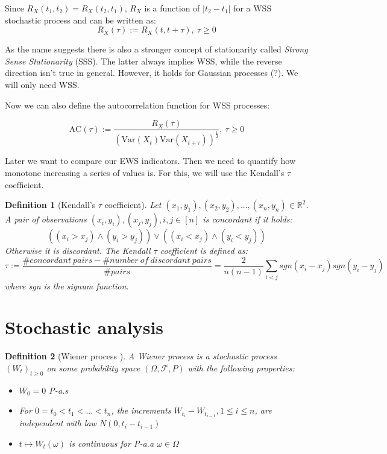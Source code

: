 \documentclass[%
thesis=student,%
coverpage=false,%
titlepage=false,%
headmarks=true, %
english,%
font=libertine, %
math=newpxtx, %
BCOR=5mm,%
coverBCOR=11mm%
]{tumbook}
\newtheorem{definition}{Definition}[section]
\begin{document}
Since $R_{X}(t_{1},t_{2}) = R_{X}(t_{2},t_{1})$, $R_{X}$ is a function of $\lvert t_{2} - t_{1} \rvert$ for a WSS stochastic process and can be written as:
\[
R_{X}(\tau) := R_{X}(t,t + \tau), \ \tau \geq 0
\]

As the name suggests there is also a stronger concept of stationarity called \textit{Strong Sense Stationarity} (SSS). The latter always implies WSS, while the reverse direction isn't true in general. However, it holds for Gaussian processes (?). We will only need WSS.

Now we can also define the autocorrelation function for WSS processes:

\[
\text{AC}(\tau) := \frac{R_{X}(\tau)}{(\text{Var}(X_{t})\text{Var}(X_{t+\tau}))^{\frac{1}{2}}}, \ \tau \geq 0
\]

Later we want to compare our EWS indicators. Then we need to quantify how monotone increasing a series of values is. For this, we will use the Kendall's $\tau$ coefficient. 

\begin{definition}[Kendall's $\tau$ coefficient]
\label{def:Kendall tau}
Let $(x_{1},y_{1}),(x_{2},y_{2}),...,(x_{n},y_{n})\in \mathbb{R}^{2}$. A pair of observations $(x_{i},y_{i}),(x_{j},y_{j}), i,j \in [n]$ is concordant if it holds:
\[
((x_{i} > x_{j}) \wedge (y_{i} > y_{j})) \vee
((x_{i} < x_{j}) \wedge (y_{i} < y_{j}))
\]
Otherwise it is discordant. The Kendall $\tau$ coefficient is defined as:
\[
\tau := \frac{\#concordant\ pairs - \#number\ of\ discordant\ pairs}{\#pairs} = \frac{2}{n(n-1)}\sum_{i<j}sgn(x_{i}-x_{j})sgn(y_{i}-y_{j})
\]
where sgn is the signum function.    
\end{definition}


\section{Stochastic analysis}

\begin{definition}[Wiener process \cite{gantert:2024}]
A Wiener process is a stochastic process $(W_{t})_{t\geq 0}$ on some probability space $(\Omega,\mathcal{F},P)$ with the following properties: 
\begin{itemize}
    \item $W_{0} = 0$ P-a.s
    \item For $0 = t_{0} < t_{1} < ... < t_{n}$, the increments $W_{t_{i}} - W_{t_{i-1}}, 1 \leq i \leq n$, are independent with law $N(0,t_{i}-t_{i-1})$
    \item $t \mapsto W_{t}(\omega)$ is continuous for P-a.a $\omega \in \Omega$
\end{itemize}
\end{definition}
\end{document}
